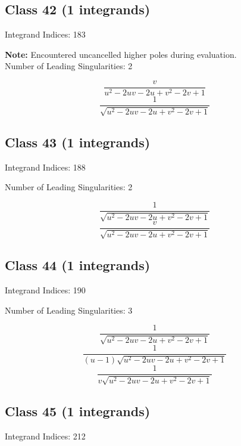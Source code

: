 \documentclass[11pt,a4paper]{article}
\begin{document}
\subsection*{Class 42 (1 integrands)}
Integrand Indices: 183

\textbf{Note:} Encountered uncancelled higher poles during evaluation.\\[1em]

Number of Leading Singularities: 2

\begin{equation}
\frac{v}{u^2-2 u v-2 u+v^2-2 v+1}
\end{equation}
\begin{equation}
\frac{1}{\sqrt{u^2-2 u v-2 u+v^2-2 v+1}}
\end{equation}


\subsection*{Class 43 (1 integrands)}
Integrand Indices: 188

Number of Leading Singularities: 2

\begin{equation}
\frac{1}{\sqrt{u^2-2 u v-2 u+v^2-2 v+1}}
\end{equation}
\begin{equation}
\frac{v}{\sqrt{u^2-2 u v-2 u+v^2-2 v+1}}
\end{equation}


\subsection*{Class 44 (1 integrands)}
Integrand Indices: 190

Number of Leading Singularities: 3

\begin{equation}
\frac{1}{\sqrt{u^2-2 u v-2 u+v^2-2 v+1}}
\end{equation}
\begin{equation}
\frac{1}{(u-1) \sqrt{u^2-2 u v-2 u+v^2-2 v+1}}
\end{equation}
\begin{equation}
\frac{1}{v \sqrt{u^2-2 u v-2 u+v^2-2 v+1}}
\end{equation}


\subsection*{Class 45 (1 integrands)}
Integrand Indices: 212
\end{document}
